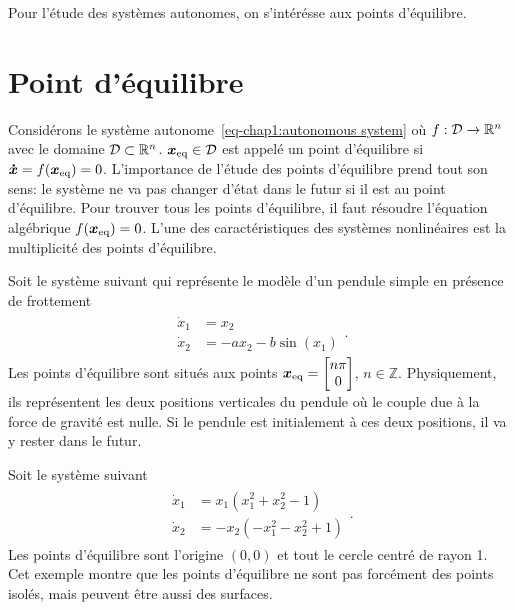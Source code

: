 Pour l'étude des systèmes autonomes, on s'intérésse aux points d'équilibre.


\section{Point d'équilibre}
Considérons le système autonome~\eqref{eq-chap1:autonomous system} où $f:{\cal D}\rightarrow\mathbb{R}^n$ avec le domaine ${\cal D}\subset\mathbb{R}^n$. $\bm{x}_{\rm eq}\in{\cal D}$ est appelé un point d'équilibre si $\bm{\dot{x}}=f(\bm{x}_{\rm eq})=0$. L'importance de l'étude des points d'équilibre prend tout son sens: le système ne va pas changer d'état dans le futur si il est au point d'équilibre. Pour trouver tous les points d'équilibre, il faut résoudre l'équation algébrique $f(\bm{x}_{\rm eq})=0$. L'une des caractéristiques des systèmes nonlinéaires est la multiplicité des points d'équilibre. 
\begin{example}\label{expl:pendule simple} 
	Soit le système suivant qui représente le modèle d'un pendule simple en présence de frottement
	\begin{align*}
		\begin{split}
			\dot{x}_1 &= x_2\\
			\dot{x}_2 &=-ax_2 -b\sin(x_1)
		\end{split}.
	\end{align*}
	Les points d'équilibre sont situés aux points $\bm{x}_{\rm eq}=\begin{bmatrix}
	n\pi\\0
	\end{bmatrix}$, $n\in\mathbb{Z}$. Physiquement, ils représentent les deux positions verticales du pendule où le couple due à la force de gravité est nulle. Si le pendule est initialement à ces deux positions, il va y rester dans le futur.
\end{example}
\begin{example}
Soit le système suivant 
\begin{align*}
	\begin{split}
		\dot{x}_1 &=x_1(x_1^2+x_2^2-1) \\ 
		\dot{x}_2 &=-x_2(-x_1^2-x_2^2+1)
	\end{split}.
\end{align*}
Les points d'équilibre sont l'origine $(0,0)$ et tout le cercle centré de rayon 1. Cet exemple montre que les points d'équilibre ne sont pas forcément des points isolés, mais peuvent être aussi des surfaces.
\end{example}
